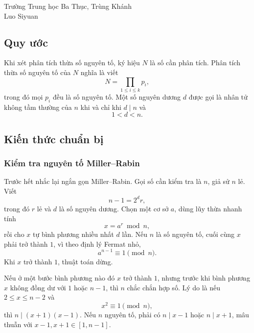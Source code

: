 \documentclass[11pt]{article}
\begin{document}
\begin{center}
Trường Trung học Ba Thục, Trùng Khánh\\
Luo Siyuan
\end{center}

\renewcommand{\abstractname}{Tóm tắt}
\begin{abstract}
Số học là một mảng lớn trong thi tin học; nhiều bài toán liên quan tới phân
tích thừa số nguyên tố, và bản thân phân tích thừa số nguyên tố cũng có vị trí
quan trọng trong học thuật. Bài viết giới thiệu ba thuật toán phân tích thừa
số nguyên tố còn ít phổ biến trong phạm vi OI, nhưng bản thân thuật toán khá
gọn: SQUFOF, CFRAC và sàng bậc hai.
\end{abstract}

\subsection{Quy ước}

Khi xét phân tích thừa số nguyên tố, ký hiệu \(N\) là số cần phân tích. Phân
tích thừa số nguyên tố của \(N\) nghĩa là viết
\[
  N=\prod_{1\le i\le k}p_i,
\]
trong đó mọi \(p_i\) đều là số nguyên tố. Một số nguyên dương \(d\) được gọi
là nhân tử không tầm thường của \(n\) khi và chỉ khi \(d\mid n\) và
\[
  1<d<n.
\]

\subsection{Kiến thức chuẩn bị}

\subsubsection{Kiểm tra nguyên tố Miller--Rabin}

Trước hết nhắc lại ngắn gọn Miller--Rabin. Gọi số cần kiểm tra là \(n\), giả
sử \(n\) lẻ. Viết
\[
  n-1=2^d r,
\]
trong đó \(r\) lẻ và \(d\) là số nguyên dương. Chọn một cơ sở \(a\), dùng lũy
thừa nhanh tính
\[
  x=a^r\bmod n,
\]
rồi cho \(x\) tự bình phương nhiều nhất \(d\) lần. Nếu \(n\) là số nguyên tố,
cuối cùng \(x\) phải trở thành \(1\), vì theo định lý Fermat nhỏ,
\[
  a^{n-1}\equiv 1\pmod n.
\]
Khi \(x\) trở thành \(1\), thuật toán dừng.

Nếu ở một bước bình phương nào đó \(x\) trở thành \(1\), nhưng trước khi bình
phương \(x\) không đồng dư với \(1\) hoặc \(n-1\), thì \(n\) chắc chắn hợp số.
Lý do là nếu \(2\le x\le n-2\) và
\[
  x^2\equiv 1\pmod n,
\]
thì \(n\mid (x+1)(x-1)\). Nếu \(n\) nguyên tố, phải có \(n\mid x-1\) hoặc
\(n\mid x+1\), mâu thuẫn với \(x-1,x+1\in[1,n-1]\).
\end{document}
